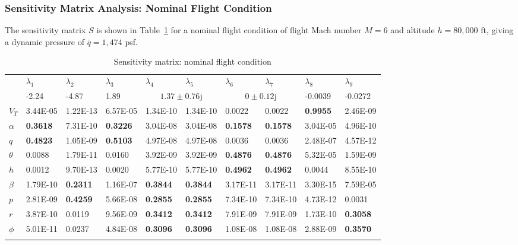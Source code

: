 \subsubsection*{Sensitivity Matrix Analysis: Nominal Flight Condition}
The sensitivity matrix $S$ is shown in Table~\ref{sensmat_fc1_1} for a nominal flight condition of flight Mach number $M=6$ and altitude $h=80,000$ ft, giving a dynamic pressure of $\bar{q}=1,474$ psf.

\begin{table}[H]
  \centering
  \caption{Sensitivity matrix: nominal flight condition}
  \fontsize{8pt}{8pt}\selectfont
  \begin{tabularx}{0.95\textwidth}{|X|XXXXX|XXXX|} %
    \cline{2-10}
    \multicolumn{1}{c|}{} & $\lambda_{1}$ & $\lambda_{2}$ & $\lambda_{3}$ & $\lambda_{4}$ & $\lambda_{5}$ & $\lambda_{6}$ & $\lambda_{7}$ & $\lambda_{8}$ & $\lambda_{9}$ \\
    \multicolumn{1}{c|}{} &  -2.24 & -4.87 & 1.89 & \multicolumn{2}{c|}{$1.37\pm 0.76\mathrm{j}$} & \multicolumn{2}{c}{$0\pm 0.12\mathrm{j}$} & -0.0039 & -0.0272 \\
    \hline %
    $V_{T}$ & 3.44E-05 & 1.22E-13 & 6.57E-05 & 1.34E-10 & 1.34E-10 & 0.0022 & 0.0022 & \textbf{0.9955} & 2.46E-09 \\
    \hline %
    $\alpha$ & \textbf{0.3618} & 7.31E-10 & \textbf{0.3226} & 3.04E-08 & 3.04E-08 & \textbf{0.1578} & \textbf{0.1578} & 3.04E-05 & 4.96E-10 \\
    $q$     & \textbf{0.4823} & 1.05E-09 & \textbf{0.5103} & 4.97E-08 & 4.97E-08 & 0.0036 & 0.0036 & 2.48E-07 & 4.57E-12 \\
    $\theta$ & 0.0088 & 1.79E-11 & 0.0160 & 3.92E-09 & 3.92E-09 & \textbf{0.4876} & \textbf{0.4876} & 5.32E-05 & 1.59E-09 \\
    $h$     & 0.0012 & 9.70E-13 & 0.0020 & 5.77E-10 & 5.77E-10 & \textbf{0.4962} & \textbf{0.4962} & 0.0044 & 8.55E-10 \\
    \hline %
    $\beta$ & 1.79E-10 & \textbf{0.2311} & 1.16E-07 & \textbf{0.3844} & \textbf{0.3844} & 3.17E-11 & 3.17E-11 & 3.30E-15 & 7.59E-05 \\
    $p$     & 2.81E-09 & \textbf{0.4259} & 5.66E-08 & \textbf{0.2855} & \textbf{0.2855} & 7.34E-10 & 7.34E-10 & 4.73E-12 & 0.0031 \\
    $r$     & 3.87E-10 & 0.0119 & 9.56E-09 & \textbf{0.3412} & \textbf{0.3412} & 7.91E-09 & 7.91E-09 & 1.73E-10 & \textbf{0.3058} \\
    $\phi$ & 5.01E-11 & 0.0237 & 4.84E-08 & \textbf{0.3096} & \textbf{0.3096} & 1.08E-08 & 1.08E-08 & 2.88E-09 & \textbf{0.3570} \\
    \lasthline%
  \end{tabularx}\label{sensmat_fc1_1}
\end{table}
